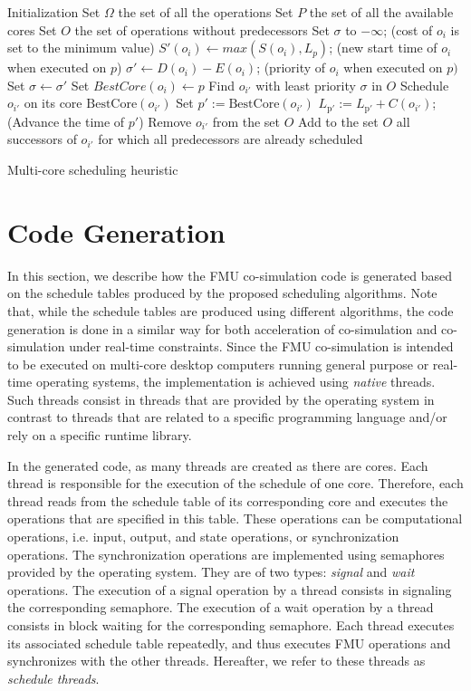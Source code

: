 \begin{algorithm}[!htp]		
	  Initialization\;
		Set $\Omega$ the set of all the operations\;  
		Set $P$ the set of all the available cores\; 
 		Set $O$ the set of operations without predecessors\;  		
		{
			{
 				Set $\sigma$ to $-\infty$; (cost of $o_i$ is set to the minimum value)\;
				{
  				$S'(o_i) \leftarrow max(S(o_i) , L_p)$; (new start time of $o_i$ when executed on $p$)\;
  				$\sigma' \leftarrow D(o_i) - E(o_i)$; (priority of $o_i$ when executed on $p)$\;
					{
  					Set $\sigma \leftarrow \sigma'$\;
  					Set $BestCore(o_i) \leftarrow p$\;
  				}
  			}
  		 }
  		 Find $o_{i'}$ with least priority $\sigma$ in $O$\; 
  		 Schedule $o_{i'}$ on its core $\mathrm{BestCore}(o_{i'})$\;
  		 Set $p' := \mathrm{BestCore}(o_{i'})$\;
  		 $L_{\mathrm{p'}} := L_{\mathrm{p'}} + C(o_{i'})$; (Advance the time of $p'$)\;
  		 Remove $o_{i'}$ from the set $O$\;
  		 Add to the set $O$ all successors of $o_{i'}$ for which all predecessors are already scheduled\;
		}
	\caption{Multi-core scheduling heuristic}
	\label{algo:schedRT}
\end{algorithm} 

\section{Code Generation}

In this section, we describe how the FMU co-simulation code is generated based on the schedule tables produced by the proposed scheduling algorithms. Note that, while the schedule tables are produced using different algorithms, the code generation is done in a similar way for both acceleration of co-simulation and co-simulation under real-time constraints. Since the FMU co-simulation is intended to be executed on multi-core desktop computers running general purpose or real-time operating systems, the implementation is achieved using \textit{native} threads. Such threads consist in threads that are provided by the operating system in contrast to threads that are related to a specific programming language and/or rely on a specific runtime library.

In the generated code, as many threads are created as there are cores. Each thread is responsible for the execution of the schedule of one core. Therefore, each thread reads from the schedule table of its corresponding core and executes the operations that are specified in this table. These operations can be computational operations, i.e. input, output, and state operations, or synchronization operations. The synchronization operations are implemented using semaphores provided by the operating system. They are of two types: \textit{signal} and \textit{wait} operations. The execution of a signal operation by a thread consists in signaling the corresponding semaphore. The execution of a wait operation by a thread consists in block waiting for the corresponding semaphore. Each thread executes its associated schedule table repeatedly, and thus executes FMU operations and synchronizes with the other threads. Hereafter, we refer to these threads as \textit{schedule threads}. 

